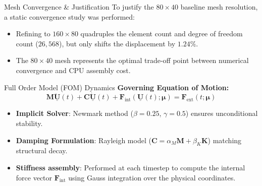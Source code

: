 \documentclass[aspectratio=169, 10pt]{beamer}
\newcommand{\mat}[1]{\mathbf{#1}}
\begin{document}
\begin{frame}{Mesh Convergence \& Justification}
    To justify the $80 \times 40$ baseline mesh resolution, a static convergence study was performed:
    \begin{table}
        \centering
    \end{table}
    \begin{itemize}
        \item Refining to $160 \times 80$ quadruples the element count and degree of freedom count ($26,568$), but only shifts the displacement by $1.24\%$.
        \item The $80 \times 40$ mesh represents the optimal trade-off point between numerical convergence and CPU assembly cost.
    \end{itemize}
\end{frame}

\begin{frame}{Full Order Model (FOM) Dynamics}
    \textbf{Governing Equation of Motion:}
    \begin{equation*}
        \mat{M} \ddot{\underline{\mathbf{U}}}(t) + \mat{C} \dot{\underline{\mathbf{U}}}(t) + \mathbf{F}_{\text{int}}(\underline{\mathbf{U}}(t); \boldsymbol{\mu}) = \mathbf{F}_{\text{ext}}(t; \boldsymbol{\mu})
    \end{equation*}
    \begin{itemize}
        \item \textbf{Implicit Solver}: Newmark method ($\beta = 0.25$, $\gamma = 0.5$) ensures unconditional stability.
        \item \textbf{Damping Formulation}: Rayleigh model ($\mat{C} = \alpha_M \mat{M} + \beta_K \mat{K}$) matching structural decay.
        \item \textbf{Stiffness assembly}: Performed at each timestep to compute the internal force vector $\mathbf{F}_{\text{int}}$ using Gauss integration over the physical coordinates.
    \end{itemize}
\end{frame}
\end{document}
